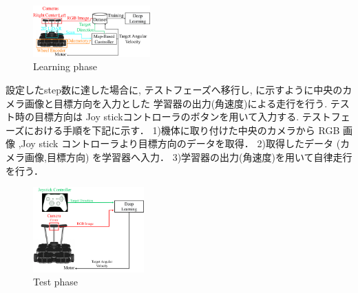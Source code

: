 \documentclass[10pt]{jarticle}
\begin{document}
    \begin{center}
        \begin{figure}[h]
            \centering
            \includegraphics[width=0.40\textwidth]{./fig/system_learning.pdf}
            \caption{Learning phase}
            \label{fig:system_learning}
        \end{figure}
    \end{center}
    
    
    設定したstep数に達した場合に, テストフェーズへ移行し,
    に示すように中央のカメラ画像と目標方向を入力とした
    学習器の出力(角速度)による走行を行う.
    テスト時の目標方向は Joy stickコントローラのボタンを用いて入力する.
    テストフェーズにおける手順を下記に示す．
    1)機体に取り付けた中央のカメラから RGB 画像 ,Joy stick コントローラより目標方向のデータを取得．
    2)取得したデータ (カメラ画像,目標方向) を学習器へ入力．
    3)学習器の出力(角速度)を用いて自律走行を行う．
    \begin{center}
        \begin{figure}[h]
            \centering
            \includegraphics[width=0.38\textwidth]{./fig/system_test.pdf}
            \caption{Test phase}
            \label{fig:system_test}
        \end{figure}
    \end{center}
    
\end{document}

